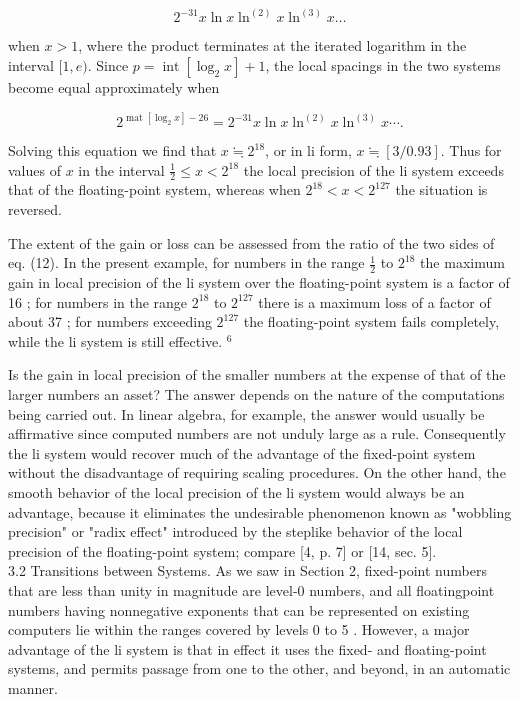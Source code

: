\documentclass[10pt]{article}
\begin{document}
$$
2^{-31} x \ln x \ln ^{(2)} x \ln ^{(3)} x \ldots
$$

when $x>1$, where the product terminates at the iterated logarithm in the interval $[1, e)$. Since $p=\operatorname{int}\left[\log _{2} x\right]+1$, the local spacings in the two systems become equal approximately when


\begin{equation*}
2^{\operatorname{mat}\left[\log _{2} x\right]-26}=2^{-31} x \ln x \ln ^{(2)} x \ln ^{(3)} x \cdots . \tag{12}
\end{equation*}


Solving this equation we find that $x \fallingdotseq 2^{18}$, or in li form, $x \fallingdotseq[3 / 0.93]$. Thus for values of $x$ in the interval $\frac{1}{2} \leq x<2^{18}$ the local precision of the li system exceeds that of the floating-point system, whereas when $2^{18}<x<2^{127}$ the situation is reversed.

The extent of the gain or loss can be assessed from the ratio of the two sides of eq. (12). In the present example, for numbers in the range $\frac{1}{2}$ to $2^{18}$ the maximum gain in local precision of the li system over the floating-point system is a factor of 16 ; for numbers in the range $2^{18}$ to $2^{127}$ there is a maximum loss of a factor of about 37 ; for numbers exceeding $2^{127}$ the floating-point system fails completely, while the li system is still effective. ${ }^{6}$

Is the gain in local precision of the smaller numbers at the expense of that of the larger numbers an asset? The answer depends on the nature of the computations being carried out. In linear algebra, for example, the answer would usually be affirmative since computed numbers are not unduly large as a rule. Consequently the li system would recover much of the advantage of the fixed-point system without the disadvantage of requiring scaling procedures. On the other hand, the smooth behavior of the local precision of the li system would always be an advantage, because it eliminates the undesirable phenomenon known as "wobbling precision" or "radix effect" introduced by the steplike behavior of the local precision of the floating-point system; compare [4, p. 7] or [14, sec. 5].\\
3.2 Transitions between Systems. As we saw in Section 2, fixed-point numbers that are less than unity in magnitude are level-0 numbers, and all floatingpoint numbers having nonnegative exponents that can be represented on existing computers lie within the ranges covered by levels 0 to 5 . However, a major advantage of the li system is that in effect it uses the fixed- and floating-point systems, and permits passage from one to the other, and beyond, in an automatic manner.
\end{document}
